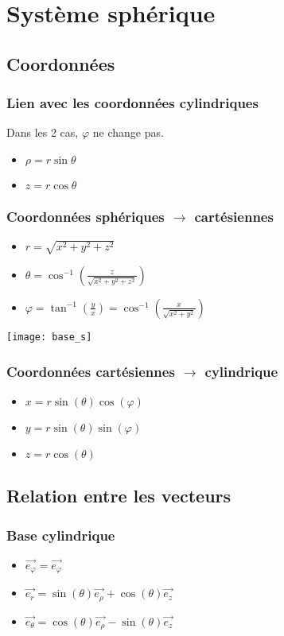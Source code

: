 \documentclass[french]{yLectureNote}
\renewcommand{\vec}{\overrightarrow}
\begin{document}
\section{Système sphérique}
\subsection{Coordonnées}
\begin{multicols}{2}
\subsubsection{Lien avec les coordonnées cylindriques}
Dans les 2 cas, $\varphi$ ne change pas.
\begin{itemize}
 \item $\rho = r\sin\theta$
 \item $z = r\cos\theta$
\end{itemize}
\subsubsection{Coordonnées sphériques $\to$ cartésiennes}
\begin{itemize}
 \item $r = \sqrt{x^2+y^2+z^2}$
 \item $\theta = \cos^{-1}(\frac{z}{\sqrt{x^2+y^2+z^2}})$
 \item $\varphi = \tan^{-1}(\frac{y}{x}) = \cos^{-1}(\frac{x}{\sqrt{x^2+y^2}})$
\end{itemize}
\columnbreak

\texttt{[image: base\_s]}
\end{multicols}


\subsubsection{Coordonnées cartésiennes $\to$ cylindrique}
\begin{itemize}
 \item $x = r\sin(\theta) \cos(\varphi)$
 \item $ y =  r\sin(\theta) \sin(\varphi)$
 \item $z = r\cos(\theta)$
\end{itemize}
\subsection{Relation entre les vecteurs}
\subsubsection{Base cylindrique}
\begin{itemize}
 \item $\vec{e_{\varphi}} = \vec{e_{\varphi}}$
 \item $\vec{e_{r}} = \sin(\theta) \vec{e_{\rho}} + \cos(\theta) \vec{e_z}$
 \item $\vec{e_{\theta}} = \cos(\theta) \vec{e_{\rho}} -\sin(\theta) \vec{e_z}$
\end{itemize}
\end{document}
